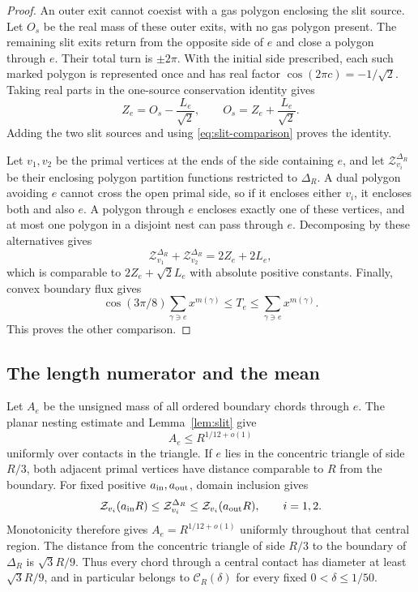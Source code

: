 \begin{proof}
An outer exit cannot coexist with a gas polygon enclosing the slit
source. Let $O_s$ be the real mass of these outer exits, with no gas
polygon present. The remaining slit exits return from the opposite
side of $e$ and close a polygon through $e$. Their total turn is
$\pm2\pi$. With the initial side prescribed, each such marked polygon
is represented once and has real factor
$\cos(2\pi c)=-1/\sqrt2$. Taking real parts in the one-source
conservation identity gives
\[
 Z_e=O_s-\frac{L_e}{\sqrt2},
 \qquad O_s=Z_e+\frac{L_e}{\sqrt2}.
\]
Adding the two slit sources and using \eqref{eq:slit-comparison}
proves the identity.

Let $v_1,v_2$ be the primal vertices at the ends of the side containing
$e$, and let $\mathcal Z^{\Delta_R}_{v_i}$ be their enclosing polygon
partition functions restricted to $\Delta_R$. A dual polygon avoiding
$e$ cannot cross the open primal side, so if it encloses either $v_i$,
it encloses both and also $e$. A polygon through $e$ encloses exactly
one of these vertices, and at most one polygon in a disjoint nest can
pass through $e$. Decomposing by these alternatives gives
\[
 \mathcal Z^{\Delta_R}_{v_1}+\mathcal Z^{\Delta_R}_{v_2}=2Z_e+2L_e,
\]
which is comparable to $2Z_e+\sqrt2L_e$ with absolute positive
constants. Finally, convex boundary flux gives
\[
 \cos(3\pi/8)\sum_{\gamma\ni e}x^{m(\gamma)}
 \le T_e\le\sum_{\gamma\ni e}x^{m(\gamma)}.
\]
This proves the other comparison.
\end{proof}

\subsection{The length numerator and the mean}

Let $A_e$ be the unsigned mass of all ordered boundary chords through
$e$. The planar nesting estimate and Lemma~\ref{lem:slit} give
\[
 A_e\le R^{1/12+o(1)}
\]
uniformly over contacts in the triangle. If $e$ lies in the concentric
triangle of side $R/3$, both adjacent primal vertices have distance
comparable to $R$ from the boundary. For fixed positive
$a_{\rm in},a_{\rm out}$, domain inclusion gives
\[
 \mathcal Z_{v_i}(a_{\rm in}R)
 \le\mathcal Z_{v_i}^{\Delta_R}
 \le\mathcal Z_{v_i}(a_{\rm out}R),\qquad i=1,2.
\]
Monotonicity therefore gives
$A_e=R^{1/12+o(1)}$ uniformly throughout that central region.
The distance from the concentric triangle of side $R/3$ to the
boundary of $\Delta_R$ is $\sqrt3R/9$. Thus every chord through a
central contact has diameter at least $\sqrt3R/9$, and in particular
belongs to $\mathcal C_R(\delta)$ for every fixed $0<\delta\le1/50$.

